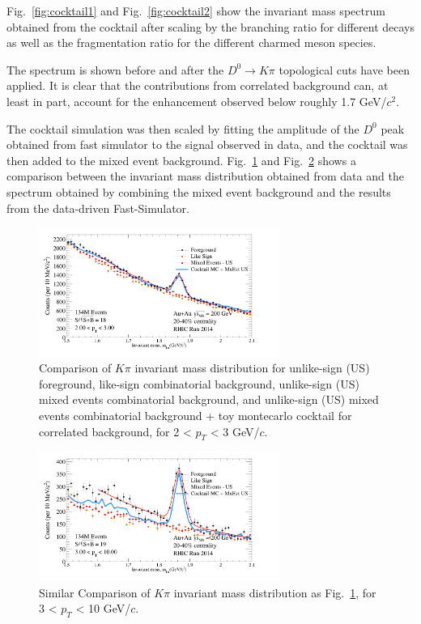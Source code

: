 \documentclass[a4paper]{article}
\begin{document}
Fig.~\ref{fig:cocktail1} and Fig.~\ref{fig:cocktail2} show the invariant mass spectrum obtained from the cocktail after scaling by the branching ratio for different decays as well as the fragmentation ratio for the different charmed meson species.

The spectrum is shown before and after the $D^0\rightarrow K\pi$ topological cuts have been applied. It is clear that the contributions from correlated background can, at least in part, account for the enhancement observed below roughly 1.7 GeV/$c^2$.

The cocktail simulation was then scaled by fitting the amplitude of the $D^0$ peak obtained from fast simulator to the signal observed in data, and the cocktail was then added to the mixed event background. Fig.~\ref{fig:bump1} and Fig.~\ref{fig:bump2} shows a comparison between the invariant mass distribution obtained from data and the spectrum obtained by combining the mixed event background and the results from the data-driven Fast-Simulator.

\begin{figure}[htbp]
\centering
\includegraphics[keepaspectratio,width=0.7\textwidth]{fig/D0_FG_EvMxBg_coktail_2040_2_pT_3.png}
\caption{Comparison of $K\pi$ invariant mass distribution for unlike-sign (US) foreground, like-sign combinatorial background, unlike-sign (US) mixed events combinatorial background, and unlike-sign (US) mixed events combinatorial background + toy montecarlo cocktail for correlated background, for 2 < $p_T$ < 3 GeV/$c$.}
\label{fig:bump1}
\end{figure}

\begin{figure}[htbp]
\centering
\includegraphics[keepaspectratio,width=0.7\textwidth]{fig/D0_FG_EvMcBg_cocktail_2040_3_pT_10.png}
\caption{Similar Comparison of $K\pi$ invariant mass distribution as Fig.~\ref{fig:bump1}, for 3 < $p_T$ < 10 GeV/$c$.}
\label{fig:bump2}
\end{figure}
\end{document}
